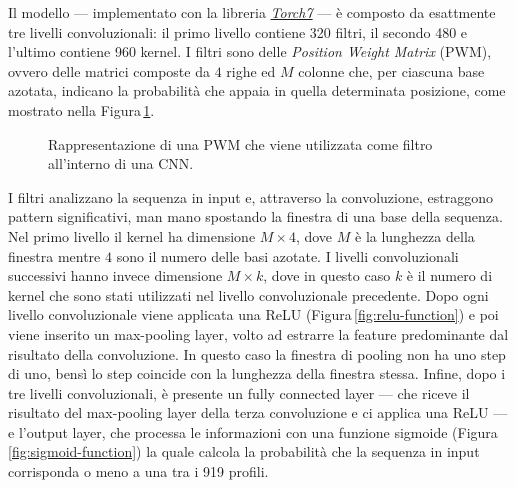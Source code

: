 Il modello — implementato con la libreria \href{https://github.com/torch/torch7}{\textsl{Torch7}} — è composto da esattmente tre livelli convoluzionali: il primo livello contiene 320 filtri, il secondo 480 e l'ultimo contiene 960 kernel. I filtri sono delle \textit{Position Weight Matrix} (\acs{PWM}), ovvero delle matrici composte da $4$ righe ed $M$ colonne che, per ciascuna base azotata, indicano la probabilità che appaia in quella determinata posizione, come mostrato nella Figura\,\ref{fig:PWM}.
% 
\begin{figure}[!b]
    \centering
    
    \caption[Rappresentazione di una \acs{PWM}.]{Rappresentazione di una \acs{PWM} che viene utilizzata come filtro all'interno di una \acs{CNN}.}\label{fig:PWM}
\end{figure}
% 
I filtri analizzano la sequenza in input e, attraverso la convoluzione, estraggono pattern significativi, man mano spostando la finestra di una base della sequenza. Nel primo livello il kernel ha dimensione $M\times 4$, dove $M$ è la lunghezza della finestra mentre $4$ sono il numero delle basi azotate. I livelli convoluzionali successivi hanno invece dimensione $M\times k$, dove in questo caso $k$ è il numero di kernel che sono stati utilizzati nel livello convoluzionale precedente. Dopo ogni livello convoluzionale viene applicata una \acs{ReLU} (Figura\,\ref{fig:relu-function}) e poi viene inserito un max-pooling layer, volto ad estrarre la feature predominante dal risultato della convoluzione. In questo caso la finestra di pooling non ha uno step di uno, bensì lo step coincide con la lunghezza della finestra stessa. Infine, dopo i tre livelli convoluzionali, è presente un fully connected layer — che riceve il risultato del max-pooling layer della terza convoluzione e ci applica una \acs{ReLU} — e l'output layer, che processa le informazioni con una funzione sigmoide (Figura\,\ref{fig:sigmoid-function}) la quale calcola la probabilità che la sequenza in input corrisponda o meno a una tra i 919 profili.

